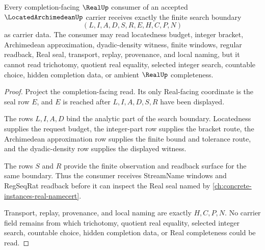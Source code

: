 \begin{theorem}
\label{thm:located-archimedean-real-search-boundary}
Every completion-facing $\RealUp$ consumer of an accepted $\LocatedArchimedeanUp$ carrier receives exactly the finite search boundary
$$
(L,I,A,D,S,R,E,H,C,P,N)
$$
as carrier data. The consumer may read locatedness budget, integer bracket, Archimedean approximation, dyadic-density witness, finite windows, regular readback, Real seal, transport, replay, provenance, and local naming, but it cannot read trichotomy, quotient real equality, selected integer search, countable choice, hidden completion data, or ambient $\RealUp$ completeness.
\end{theorem}
\begin{proof}
Project the completion-facing read. Its only Real-facing coordinate is the seal row $E$, and $E$ is reached after $L,I,A,D,S,R$ have been displayed.

The rows $L,I,A,D$ bind the analytic part of the search boundary. Locatedness supplies the request budget, the integer-part row supplies the bracket route, the Archimedean approximation row supplies the finite bound and tolerance route, and the dyadic-density row supplies the displayed witness.

The rows $S$ and $R$ provide the finite observation and readback surface for the same boundary. Thus the consumer receives StreamName windows and RegSeqRat readback before it can inspect the Real seal named by \autoref{ch:concrete-instances-real-namecert}.

Transport, replay, provenance, and local naming are exactly $H,C,P,N$. No carrier field remains from which trichotomy, quotient real equality, selected integer search, countable choice, hidden completion data, or Real completeness could be read.
\end{proof}




